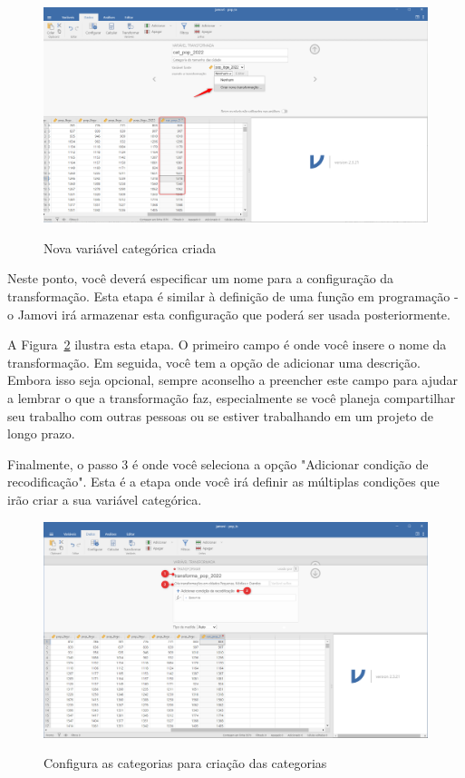 \begin{figure}[H]
    \centering
    \caption{Nova variável categórica criada}
    \includegraphics[width=\textwidth]{imagens/cap_2/criar_categoria_jamovi_3.png}
    \label{fig:criar_categoria_jamovi_3}
\end{figure}

Neste ponto, você deverá especificar um nome para a configuração da transformação. Esta etapa é similar à definição de uma função em programação - o Jamovi irá armazenar esta configuração que poderá ser usada posteriormente.

A Figura~\ref{fig:criar_categoria_jamovi_4} ilustra esta etapa. O primeiro campo é onde você insere o nome da transformação. Em seguida, você tem a opção de adicionar uma descrição. Embora isso seja opcional, sempre aconselho a preencher este campo para ajudar a lembrar o que a transformação faz, especialmente se você planeja compartilhar seu trabalho com outras pessoas ou se estiver trabalhando em um projeto de longo prazo.

Finalmente, o passo 3 é onde você seleciona a opção "Adicionar condição de recodificação". Esta é a etapa onde você irá definir as múltiplas condições que irão criar a sua variável categórica.

\begin{figure}[H]
    \centering
    \caption{Configura as categorias para criação das categorias}
    \includegraphics[width=\textwidth]{imagens/cap_2/criar_categoria_jamovi_4.png}
    \label{fig:criar_categoria_jamovi_4}
\end{figure}

